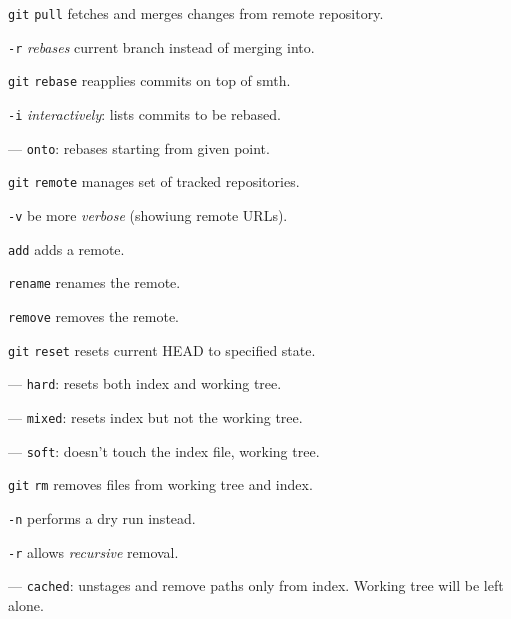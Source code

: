 \documentclass{reference_card}
\begin{document}
\begin{multicols*}{3}
\begin{compactenum}
\item [\texttt{git}] \texttt{pull} fetches and merges changes from remote repository.
\item [\texttt{-r}] \emph{rebases} current branch instead of merging into.
\end{compactenum}

\begin{compactenum}
\item [\texttt{git}] \texttt{rebase} reapplies commits on top of smth.
\item [\texttt{-i}] \emph{interactively}: lists commits to be rebased.
\item [---] \texttt{onto}: rebases starting from given point.
\end{compactenum}

\begin{compactenum}
\item [\texttt{git}] \texttt{remote} manages set of tracked repositories.
\item [\texttt{-v}] be more \emph{verbose} (showiung remote URLs).
\item [\scriptsize \texttt{add}] adds a remote.
\item [\scriptsize \texttt{rename}] renames the remote.
\item [\scriptsize \texttt{remove}] removes the remote.
\end{compactenum}

\begin{compactenum}
\item [\texttt{git}] \texttt{reset} resets current HEAD to specified state.
\item [---] \texttt{hard}: resets both index and working tree.
\item [---] \texttt{mixed}: resets index but not the working tree.
\item [---] \texttt{soft}: doesn't touch the index file, working tree.
\end{compactenum}



\begin{compactenum}
\item [\texttt{git}] \texttt{rm} removes files from working tree and index.
\item [\texttt{-n}] performs a dry run instead.
\item [\texttt{-r}] allows \emph{recursive} removal.
\item [---] \texttt{cached}: unstages and remove paths only from index. Working tree will be left alone.
\end{compactenum}


\end{multicols*}
\end{document}

